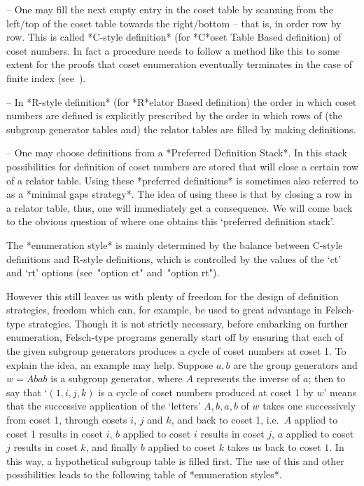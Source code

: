 \beginlist

\item{--} One may fill the next empty entry  in  the  coset  table  by
scanning from the left/top of the coset table towards the right/bottom
--  that  is,  in  order  row  by  row.  This   is   called   *C-style
definition*   (for
*C*oset Table Based definition) of coset numbers. In fact a  procedure
needs to follow a method like this to some extent for the proofs  that
coset enumeration eventually terminates in the case  of  finite  index
(see~\cite{Neu82}).

\item{--} In *R-style definition* (for *R*elator Based definition) the order in which  coset
numbers are defined is explicitly prescribed by  the  order  in  which
rows of (the subgroup generator tables and)  the  relator  tables  are
filled by making definitions.

\item{--} One may choose  definitions  from  a  *Preferred  Definition
Stack*. In this stack  possibilities
for definition of coset numbers are stored that will close  a  certain
row    of    a    relator    table.     Using     these     *preferred
definitions* is sometimes  also  referred
to as a *minimal gaps  strategy*.  The
idea of using these is that by closing a row in a relator table, thus,
one will immediately get a consequence.  We  will  come  back  to  the
obvious question of where one obtains this  \lq{}preferred  definition
stack'.

\endlist

The *enumeration style* is mainly determined by  the  balance  between
C-style definitions and R-style definitions, which  is  controlled  by
the values of the `ct' and `rt' options (see~"option  ct"  and~"option
rt").

However this still leaves us with plenty of freedom for the design  of
definition strategies, freedom which can,  for  example,  be  used  to
great advantage in Felsch-type strategies. Though it is  not  strictly
necessary,  before  embarking  on  further  enumeration,   Felsch-type
programs generally start off  by  ensuring  that  each  of  the  given
subgroup generators produces a cycle of coset numbers at coset  1.  To
explain the idea, an example may help. Suppose  $a,b$  are  the  group
generators and $w=Abab$ is a subgroup generator, where $A$  represents
the inverse of $a$; then to say that \lq{}$(1,i,j,k)$ is  a  cycle  of
coset numbers produced at coset 1 by $w$' means  that  the  successive
application  of  the  \lq{}letters'  $A,b,a,b$  of   $w$   takes   one
successively from coset 1, through cosets $i$, $j$ and $k$,  and  back
to coset 1, i.e.~$A$ applied to coset 1  results  in  coset  $i$,  $b$
applied to coset $i$ results in coset $j$, $a$ applied  to  coset  $j$
results in coset $k$, and finally $b$ applied to coset  $k$  takes  us
back to coset $1$. In this  way,  a  hypothetical  subgroup  table  is
filled first. The use of this and other  possibilities  leads  to  the
following table of *enumeration styles*.

